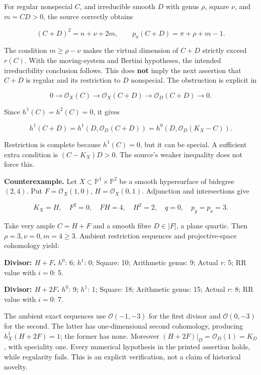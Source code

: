For regular nonspecial \(C\), and irreducible smooth \(D\) with genus \(\rho\), square \(\nu\), and \(m=CD>0\), the source correctly obtains

\[
(C+D)^2=n+\nu+2m,\qquad p_a(C+D)=\pi+\rho+m-1.
\]

The condition \(m\ge\rho-\nu\) makes the virtual dimension of \(C+D\) strictly exceed \(r(C)\). With the moving-system and Bertini hypotheses, the intended irreducibility conclusion follows. This does \textbf{not} imply the next assertion that \(C+D\) is regular and its restriction to \(D\) nonspecial. The obstruction is explicit in

\[
0\longrightarrow\mathcal O_X(C)\longrightarrow\mathcal O_X(C+D)
\longrightarrow\mathcal O_D(C+D)\longrightarrow0.
\]

Since \(h^1(C)=h^2(C)=0\), it gives

\[
h^1(C+D)=h^1(D,\mathcal O_D(C+D))
=h^0(D,\mathcal O_D(K_X-C)).
\tag{IV.8.2}
\]

Restriction is complete because \(h^1(C)=0\), but it can be special. A sufficient extra condition is \((C-K_X)D>0\). The source's weaker inequality does not force this.

\textbf{Counterexample.} Let \(X\subset\mathbb P^1\times\mathbb P^2\) be a smooth hypersurface of bidegree \((2,4)\). Put \(F=\mathcal O_X(1,0)\), \(H=\mathcal O_X(0,1)\). Adjunction and intersections give

\[
K_X=H,\quad F^2=0,\quad FH=4,\quad H^2=2,\quad
q=0,\quad p_g=p_a=3.
\]

Take very ample \(C=H+F\) and a smooth fibre \(D\in|F|\), a plane quartic. Then \(\rho=3,\nu=0,m=4\ge3\). Ambient restriction sequences and projective-space cohomology yield:

\textbf{Divisor: \(H+F\).} \(h^0\): 6; \(h^1\): 0; Square: 10; Arithmetic genus: 9; Actual \(r\): 5; RR value with \(i=0\): 5.

\textbf{Divisor: \(H+2F\).} \(h^0\): 9; \(h^1\): 1; Square: 18; Arithmetic genus: 15; Actual \(r\): 8; RR value with \(i=0\): 7.

The ambient exact sequences use \(\mathcal O(-1,-3)\) for the first divisor and \(\mathcal O(0,-3)\) for the second. The latter has one-dimensional second cohomology, producing \(h^1_X(H+2F)=1\); the former has none. Moreover \((H+2F)|_D=\mathcal O_D(1)=K_D\), with speciality one. Every numerical hypothesis in the printed assertion holds, while regularity fails. This is an explicit verification, not a claim of historical novelty.

